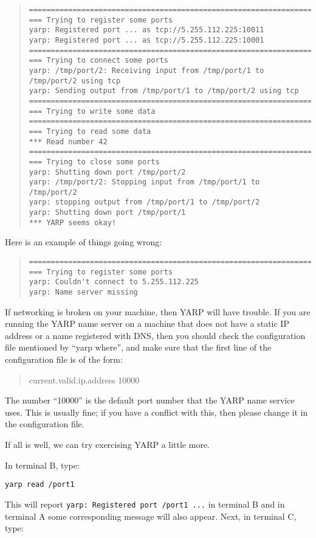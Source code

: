 \documentclass[a4]{article}
\newcommand{\ctt}[1]{{\tt #1}}
\begin{document}
\begin{quote}
{\small
\begin{verbatim}
==================================================================
=== Trying to register some ports
yarp: Registered port ... as tcp://5.255.112.225:10011
yarp: Registered port ... as tcp://5.255.112.225:10001
==================================================================
=== Trying to connect some ports
yarp: /tmp/port/2: Receiving input from /tmp/port/1 to /tmp/port/2 using tcp
yarp: Sending output from /tmp/port/1 to /tmp/port/2 using tcp
==================================================================
=== Trying to write some data
==================================================================
=== Trying to read some data
*** Read number 42
==================================================================
=== Trying to close some ports
yarp: Shutting down port /tmp/port/2
yarp: /tmp/port/2: Stopping input from /tmp/port/1 to /tmp/port/2
yarp: stopping output from /tmp/port/1 to /tmp/port/2
yarp: Shutting down port /tmp/port/1
*** YARP seems okay!
\end{verbatim}
}
\end{quote}
%
\noindent
Here is an example of things going wrong:
%
\begin{quote}
{\small
\begin{verbatim}
==================================================================
=== Trying to register some ports
yarp: Couldn't connect to 5.255.112.225
yarp: Name server missing
\end{verbatim}
}
\end{quote}

If networking is broken on your machine, then YARP will have trouble.
If you are running the YARP name server on a machine that does not
have a static IP address or a name registered with DNS, then you
should check the configuration file mentioned by ``yarp where'', and
make sure that the first line of the configuration file is of the form:
\begin{quote}
  current.valid.ip.address 10000
\end{quote}

The number ``10000'' is the default port number that the YARP name
service uses.  This is usually fine; if you have a conflict with this,
then please change it in the configuration file.

If all is well, we can try exercising YARP a little more.

In terminal B, type:
%
\begin{verbatim}
yarp read /port1
\end{verbatim}
%
This will report \ctt{yarp: Registered port /port1 ...} in terminal B and in
terminal A some corresponding message will also appear.
%
Next, in terminal C, type:
\end{document}
